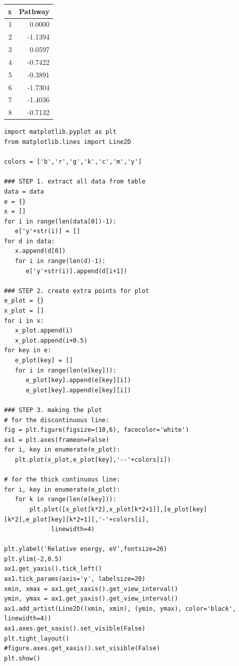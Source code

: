 \documentclass[11pt]{article}
\begin{document}
\begin{center}
\label{tab:orgd1b7b9f}
\begin{tabular}{rr}
x & Pathway\\
\hline
1 & 0.0000\\
2 & -1.1394\\
3 & 0.0597\\
4 & -0.7422\\
5 & -0.3891\\
6 & -1.7304\\
7 & -1.4036\\
8 & -0.7132\\
\end{tabular}
\end{center}

\begin{verbatim}
import matplotlib.pyplot as plt
from matplotlib.lines import Line2D

colors = ['b','r','g','k','c','m','y']

### STEP 1. extract all data from table
data = data
e = {}
x = []
for i in range(len(data[0])-1):
   e['y'+str(i)] = [] 
for d in data:
   x.append(d[0])
   for i in range(len(d)-1):
      e['y'+str(i)].append(d[i+1])

### STEP 2. create extra points for plot
e_plot = {}
x_plot = []
for i in x:
   x_plot.append(i)
   x_plot.append(i+0.5)
for key in e:
   e_plot[key] = []
   for i in range(len(e[key])):
      e_plot[key].append(e[key][i])
      e_plot[key].append(e[key][i])

### STEP 3. making the plot
# for the discontinuous line:
fig = plt.figure(figsize=(10,6), facecolor='white')
ax1 = plt.axes(frameon=False)
for i, key in enumerate(e_plot):
   plt.plot(x_plot,e_plot[key],'--'+colors[i])

# for the thick continuous line:        
for i, key in enumerate(e_plot):
   for k in range(len(e[key])):
       plt.plot([x_plot[k*2],x_plot[k*2+1]],[e_plot[key][k*2],e_plot[key][k*2+1]],'-'+colors[i],
             linewidth=4)

plt.ylabel('Relative energy, eV',fontsize=26)
plt.ylim(-2,0.5)
ax1.get_yaxis().tick_left()
ax1.tick_params(axis='y', labelsize=20)
xmin, xmax = ax1.get_xaxis().get_view_interval()
ymin, ymax = ax1.get_yaxis().get_view_interval()
ax1.add_artist(Line2D((xmin, xmin), (ymin, ymax), color='black', linewidth=4))
ax1.axes.get_xaxis().set_visible(False)
plt.tight_layout()
#figure.axes.get_xaxis().set_visible(False)
plt.show()
\end{verbatim}
\end{document}
